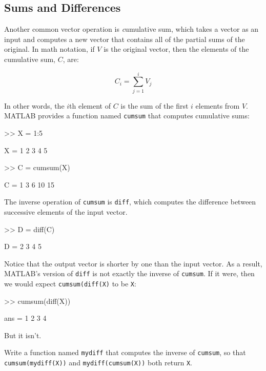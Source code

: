 \subsection{Sums and Differences}

Another common vector operation is {\emph cumulative sum}, which takes a
vector as an input and computes a new vector that contains all of the
partial sums of the original.  In math notation, if $V$ is the
original vector, then the elements of the cumulative sum, $C$, are:


\begin{equation}
C_i = \sum_{j=1}^i V_j
\end{equation}

In other words, the $i$th element of $C$ is the sum of the first
$i$ elements from $V$.  MATLAB provides a function named {\tt cumsum}
that computes cumulative sums:


\begin{code}
>> X = 1:5

X = 1     2     3     4     5

>> C = cumsum(X)

C = 1     3     6    10    15
\end{code}

The inverse operation of {\tt cumsum} is {\tt diff}, which computes
the difference between successive elements of the input vector.


\begin{code}
>> D = diff(C)

D = 2     3     4     5
\end{code}

Notice that the output vector is shorter by one than the input
vector.  As a result, MATLAB's version of {\tt diff} is not
exactly the inverse of {\tt cumsum}.  If it were, then we would
expect {\tt cumsum(diff(X)} to be {\tt X}:

\begin{code}
>> cumsum(diff(X))

ans = 1     2     3     4
\end{code}

But it isn't.

\begin{ex}
Write a function named {\tt mydiff} that computes the
inverse of {\tt cumsum}, so that {\tt cumsum(mydiff(X))} and
{\tt mydiff(cumsum(X))} both return {\tt X}.

\end{ex}


